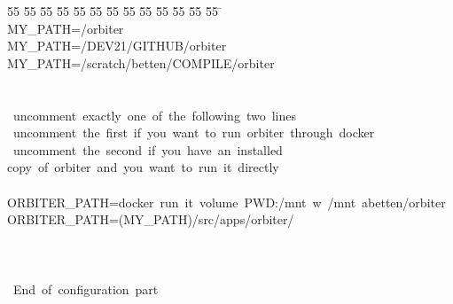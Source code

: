 %
%
\begin{tabbing}
55 \= 55 \= 55 \= 55 \= 55 \= 55 \= 55 \= 55 \= 55 \= 55 \= 55 \= 55 \= 55 \= \kill
\\[0pt]
MY\_PATH=/orbiter\\[0pt]
MY\_PATH=/DEV21/GITHUB/orbiter\\[0pt]
MY\_PATH=/scratch/betten/COMPILE/orbiter\\[0pt]
\\[0pt]
\\[0pt]
\ uncomment\ exactly\ one\ of\ the\ following\ two\ lines\\[0pt]
\ uncomment\ the\ first\ if\ you\ want\ to\ run\ orbiter\ through\ docker\\[0pt]
\ uncomment\ the\ second\ if\ you\ have\ an\ installed\ \\[0pt]
copy\ of\ orbiter\ and\ you\ want\ to\ run\ it\ directly\ \\[0pt]
\\[0pt]
ORBITER\_PATH=docker\ run\ it\ volume\ PWD:/mnt\ w\ /mnt\ abetten/orbiter\ \\[0pt]
ORBITER\_PATH=(MY\_PATH)/src/apps/orbiter/\\[0pt]
\\[0pt]
\\[0pt]
\\[0pt]
\ End\ of\ configuration\ part\\[0pt]

\end{tabbing}
